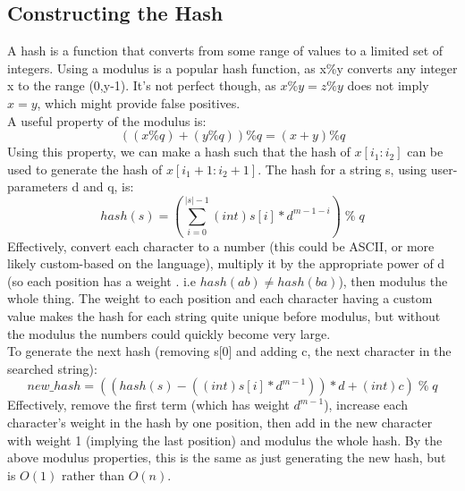 \subsection{Constructing the Hash}
A hash is a function that converts from some range of values to a limited set of integers. Using a modulus is a  popular hash function, as x\%y converts any integer x to the range (0,y-1). It's not perfect though, as \(x\%y=z\%y\) does not imply $x=y$, which might provide false positives. \\
A useful property of the modulus is: 
\begin{equation}
    ((x\%q) + (y\%q)) \% q  = (x+y) \% q \nonumber
\end{equation}
Using this property, we can make a hash such that the hash of $x[i_1:i_2]$ can be used to generate the hash of $x[i_1+1:i_2+1]$. The hash for a string s, using user-parameters d and q, is:
\begin{equation}
    hash(s) = (\sum_{i=0}^{|s|-1} (int)s[i] * d^{m-1-i})\; \boldsymbol{\%}\; q \nonumber
\end{equation}
Effectively, convert each character to a number (this could be ASCII, or more likely custom-based on the language), multiply it by the appropriate power of d (so each position has a weight . i.e $hash(ab)\neq hash(ba)$), then modulus the whole thing. The weight to each position and each character having a custom value makes the hash for each string quite unique before modulus, but without the modulus the numbers could quickly become very large. \\
To generate the next hash (removing s[0] and adding c, the next character in the searched string):
\begin{equation}
    new\_hash = ((hash(s) - ((int)s[i]*d^{m-1})) * d + (int) c)\; \boldsymbol{\%}\; q \nonumber
\end{equation}
Effectively, remove the first term (which has weight $d^{m-1}$), increase each character's weight in the hash by one position, then add in the new character with weight 1 (implying the last position) and modulus the whole hash. By the above modulus properties, this is the same as just generating the new hash, but is $O(1)$ rather than $O(n)$.
\newpage 
